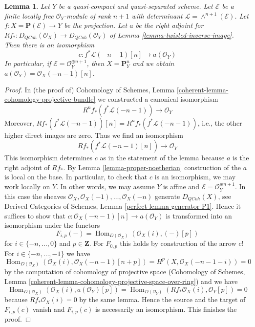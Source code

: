 \documentclass{stacks-project}
\theoremstyle{plain}
\newtheorem{lemma}[subsection]{Lemma}
\theoremstyle{definition}
\theoremstyle{remark}
\numberwithin{equation}{subsection}
\def\Hom{\mathop{\mathrm{Hom}}\nolimits}
\def\QCoh{\mathit{QCoh}}
\begin{document}
\begin{lemma}
\label{lemma-upper-shriek-P1}
Let $Y$ be a quasi-compact and quasi-separated scheme.
Let $\mathcal{E}$ be a finite locally
free $\mathcal{O}_Y$-module of rank $n + 1$ with determinant
$\mathcal{L} = \wedge^{n + 1}(\mathcal{E})$.
Let $f : X = \mathbf{P}(\mathcal{E}) \to Y$ be the projection.
Let $a$ be the right adjoint for
$Rf_* : D_\QCoh(\mathcal{O}_X) \to D_\QCoh(\mathcal{O}_Y)$ of
Lemma \ref{lemma-twisted-inverse-image}.
Then there is an isomorphism
$$
c : f^*\mathcal{L}(-n - 1)[n] \longrightarrow a(\mathcal{O}_Y)
$$
In particular, if $\mathcal{E} = \mathcal{O}_Y^{\oplus n + 1}$, then
$X = \mathbf{P}^n_Y$ and we obtain
$a(\mathcal{O}_Y) = \mathcal{O}_X(-n - 1)[n]$.
\end{lemma}

\begin{proof}
In (the proof of) Cohomology of Schemes, Lemma
\ref{coherent-lemma-cohomology-projective-bundle}
we constructed a canonical isomorphism
$$
R^nf_*(f^*\mathcal{L}(-n - 1)) \longrightarrow \mathcal{O}_Y
$$
Moreover, $Rf_*(f^*\mathcal{L}(-n - 1))[n] = R^nf_*(f^*\mathcal{L}(-n - 1))$,
i.e., the other higher direct images are zero. Thus we find an isomorphism
$$
Rf_*(f^*\mathcal{L}(-n - 1)[n]) \longrightarrow \mathcal{O}_Y
$$
This isomorphism determines $c$ as in the statement of the lemma
because $a$ is the right adjoint of $Rf_*$.
By Lemma \ref{lemma-proper-noetherian} construction of the $a$
is local on the base. In particular, to check that
$c$ is an isomorphism, we may work locally on $Y$.
In other words, we may assume $Y$ is affine and
$\mathcal{E} = \mathcal{O}_Y^{\oplus n + 1}$.
In this case the sheaves $\mathcal{O}_X, \mathcal{O}_X(-1), \ldots,
\mathcal{O}_X(-n)$ generate $D_\QCoh(X)$, see
Derived Categories of Schemes, Lemma \ref{perfect-lemma-generator-P1}.
Hence it suffices to show that
$c : \mathcal{O}_X(-n - 1)[n] \to a(\mathcal{O}_Y)$
is transformed into an isomorphism under the functors
$$
F_{i, p}(-) = \Hom_{D(\mathcal{O}_X)}(\mathcal{O}_X(i), (-)[p])
$$
for $i \in \{-n, \ldots, 0\}$ and $p \in \mathbf{Z}$.
For $F_{0, p}$ this holds by construction of the arrow $c$!
For $i \in \{-n, \ldots, -1\}$ we have
$$
\Hom_{D(\mathcal{O}_X)}(\mathcal{O}_X(i), \mathcal{O}_X(-n - 1)[n + p]) =
H^p(X, \mathcal{O}_X(-n - 1 - i)) = 0
$$
by the computation of cohomology of projective space
(Cohomology of Schemes, Lemma
\ref{coherent-lemma-cohomology-projective-space-over-ring})
and we have
$$
\Hom_{D(\mathcal{O}_X)}(\mathcal{O}_X(i), a(\mathcal{O}_Y)[p]) =
\Hom_{D(\mathcal{O}_Y)}(Rf_*\mathcal{O}_X(i), \mathcal{O}_Y[p]) = 0
$$
because $Rf_*\mathcal{O}_X(i) = 0$ by the same lemma.
Hence the source and the target of $F_{i, p}(c)$ vanish
and $F_{i, p}(c)$ is necessarily an isomorphism.
This finishes the proof.
\end{proof}
\end{document}
